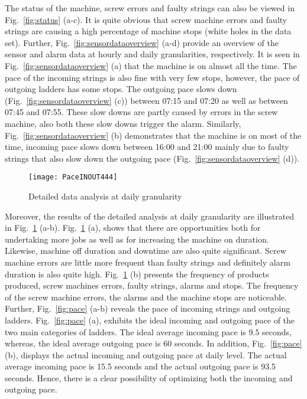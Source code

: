 \documentclass[runningheads]{llncs}
\begin{document}
The status of the machine, screw errors and faulty strings can also be viewed in Fig.~\ref{fig:status} (a-c). It is quite obvious that screw machine errors and faulty strings are causing a high percentage of machine stops (white holes in the data set). Further, Fig.~\ref{fig:sensordataoverview} (a-d) provide an overview of the sensor and alarm data at hourly and daily granularities, respectively. It is seen in Fig.~\ref{fig:sensordataoverview} (a) that the machine is on almost all the time. The pace of the incoming strings is also fine with very few stops, however, the pace of outgoing ladders has some stops. The outgoing pace slows down (Fig.~\ref{fig:sensordataoverview} (c)) between 07:15 and 07:20 as well as between 07:45 and 07:55. These slow downs are partly caused by errors in the screw machine, also both these slow downs trigger the alarm. Similarly,  Fig.~\ref{fig:sensordataoverview} (b) demonstrates that the machine is on most of the time, incoming pace slows down between 16:00 and 21:00 mainly due to faulty strings that also slow down the outgoing pace (Fig.~\ref{fig:sensordataoverview} (d)).

\begin{figure}
\centering
\texttt{[image: PaceINOUT444]} 
\caption{Detailed data analysis at daily granularity \cite{nadeem}}
\label{fig:detailedanalysis}
\end{figure}

Moreover, the results of the detailed analysis at daily granularity are illustrated in Fig.~\ref{fig:detailedanalysis} (a-b). Fig.~\ref{fig:detailedanalysis} (a), shows that there are opportunities both for undertaking more jobs as well as for increasing the machine on duration. Likewise, machine off duration and downtime are also quite significant. Screw machine errors are little more frequent than  faulty strings and definitely alarm duration is also quite high. Fig.~\ref{fig:detailedanalysis} (b) presents the frequency of products produced, screw machines errors, faulty strings, alarms and stops. The frequency of the screw machine errors, the alarms and the machine stops are noticeable. Further, Fig.~\ref{fig:pace} (a-b) reveals the pace of  incoming strings and outgoing ladders. Fig.~\ref{fig:pace} (a), exhibits the ideal incoming and outgoing pace of the two main categories of ladders. The ideal average incoming pace is 9.5 seconds, whereas, the ideal average outgoing pace is 60 seconds. In addition, Fig.~\ref{fig:pace} (b), displays the actual incoming and outgoing pace at daily level. The actual average incoming pace is 15.5 seconds and the actual outgoing pace is 93.5 seconds. Hence, there is a clear possibility of optimizing both the incoming and outgoing pace.
\end{document}
